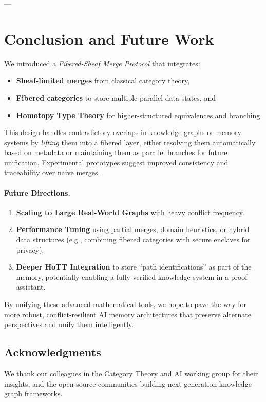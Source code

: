 \documentclass{article}
\begin{document}
---

\section{Conclusion and Future Work}
\label{sec:conclusion}

We introduced a \emph{Fibered-Sheaf Merge Protocol} that integrates:
\begin{itemize}
    \item \textbf{Sheaf-limited merges} from classical category theory,  
    \item \textbf{Fibered categories} to store multiple parallel data states, and  
    \item \textbf{Homotopy Type Theory} for higher-structured equivalences and branching.  
\end{itemize}

This design handles contradictory overlaps in knowledge graphs or memory systems by \emph{lifting} them into a fibered layer, either resolving them automatically based on metadata or maintaining them as parallel branches for future unification. Experimental prototypes suggest improved consistency and traceability over naive merges.

\paragraph{Future Directions.}
\begin{enumerate}
    \item \textbf{Scaling to Large Real-World Graphs} with heavy conflict frequency.  
    \item \textbf{Performance Tuning} using partial merges, domain heuristics, or hybrid data structures (e.g., combining fibered categories with secure enclaves for privacy).  
    \item \textbf{Deeper HoTT Integration} to store “path identifications” as part of the memory, potentially enabling a fully verified knowledge system in a proof assistant.  
\end{enumerate}

By unifying these advanced mathematical tools, we hope to pave the way for more robust, conflict-resilient AI memory architectures that preserve alternate perspectives and unify them intelligently.

\subsection*{Acknowledgments}
We thank our colleagues in the Category Theory and AI working group for their insights, and the open-source communities building next-generation knowledge graph frameworks.
\end{document}
